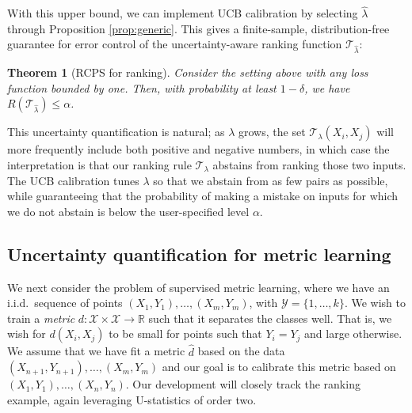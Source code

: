 \documentclass[10pt]{article}
\newtheorem{theorem}{Theorem}
\def\R{\mathbb{R}}
\newcommand{\Y}{\mathcal{Y}}
\newcommand{\X}{\mathcal{X}}
\newcommand{\T}{\mathcal{T}}
\begin{document}
With this upper bound, we can implement UCB calibration by selecting $\hat{\lambda}$ through Proposition \ref{prop:generic}. This gives a finite-sample, distribution-free guarantee for error control of the uncertainty-aware ranking function $\T_{\hat{\lambda}}$:
\begin{theorem}[RCPS for ranking]
\label{thm:ranking}
Consider the setting above with any loss function bounded by one. Then, with probability at least $1-\delta$, we have $R(\T_{\hat{\lambda}}) \le \alpha$.
\end{theorem}

This uncertainty quantification is natural; as $\lambda$ grows, the set $\T_\lambda(X_i, X_j)$ will more frequently include both positive and negative numbers, in which case the interpretation is that our ranking rule $\T_\lambda$ abstains from ranking those two inputs. The UCB calibration tunes $\lambda$ so that we abstain from as few pairs as possible, while guaranteeing that the probability of making a mistake on inputs for which we do not abstain is below the user-specified level $\alpha$.

\subsection{Uncertainty quantification for metric learning}
We next consider the problem of supervised metric learning, where we have an i.i.d.\ sequence of points $(X_1,Y_1),\dots, (X_m, Y_m)$, with $\Y = \{1,\dots,k\}$. We wish to train a {\em metric} $d : \X \times \X \to \R$ such that it separates the classes well. That is, we wish for $d(X_i, X_j)$ to be small for points such that $Y_i = Y_j$ and large otherwise. We assume that we have fit a metric $\hat{d}$ based on the data $(X_{n+1}, Y_{n+1}), \dots, (X_m, Y_m)$ and our goal is to calibrate this metric based on $(X_1,Y_1),\dots,(X_n, Y_n)$. Our development will closely track the ranking example, again leveraging U-statistics of order two.
\end{document}
